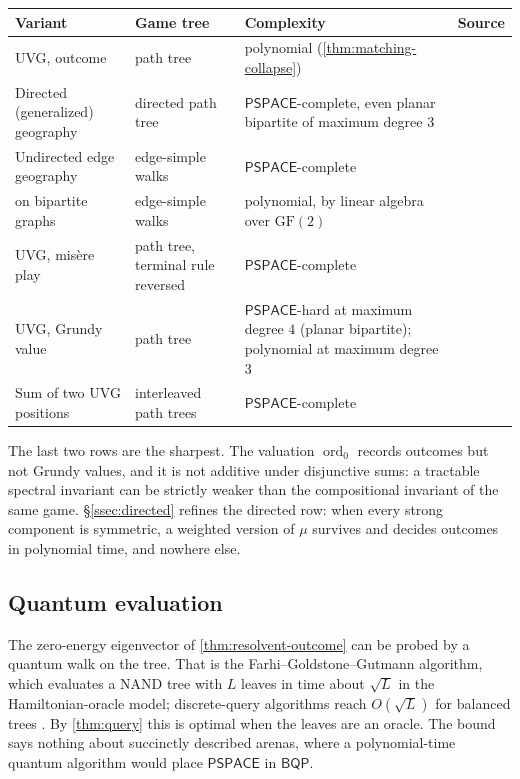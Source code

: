 \documentclass[final]{siamart0516}
\numberwithin{theorem}{section}
\numberwithin{equation}{section}
\theoremstyle{siamnonum}
\theoremstyle{plain}
\newcommand{\ord}{\operatorname{ord}}
\newcommand{\cls}[1]{\mathsf{#1}}
\newcommand{\PSPACE}{\cls{PSPACE}}
\newcommand{\BQP}{\cls{BQP}}
\begin{document}
\begin{center}
\begin{tabularx}{\linewidth}{@{}L{0.24}L{0.2}>{\raggedright\arraybackslash}X L{0.19}@{}}
\toprule
Variant & Game tree & Complexity & Source\\ \midrule
UVG, outcome & path tree & polynomial (\cref{thm:matching-collapse}) & \cite{FSU}\\
Directed (generalized) geography & directed path tree & $\PSPACE$-complete, even planar bipartite of maximum degree $3$ & \cite{LichtensteinSipser}\\
Undirected edge geography & edge-simple walks & $\PSPACE$-complete & \cite{FSU}\\
\quad on bipartite graphs & edge-simple walks & polynomial, by linear algebra over $\mathrm{GF}(2)$ & \cite{FSU}\\
UVG, mis\`ere play & path tree, terminal rule reversed & $\PSPACE$-complete & \cite{RenaultSchmidt}\\
UVG, Grundy value & path tree & $\PSPACE$-hard at maximum degree $4$ (planar bipartite); polynomial at maximum degree $3$ & \cite{BFT}\\
Sum of two UVG positions & interleaved path trees & $\PSPACE$-complete & \cite{BFT}\\
\bottomrule
\end{tabularx}
\end{center}

The last two rows are the sharpest. The valuation $\ord_0$ records outcomes but not Grundy values, and it is not additive under disjunctive sums: a tractable spectral invariant can be strictly weaker than the compositional invariant of the same game. \S\ref{ssec:directed} refines the directed row: when every strong component is symmetric, a weighted version of $\mu$ survives and decides outcomes in polynomial time, and nowhere else.

\subsection{Quantum evaluation}
The zero-energy eigenvector of \cref{thm:resolvent-outcome} can be probed by a quantum walk on the tree. That is the Farhi--Goldstone--Gutmann algorithm, which evaluates a NAND tree with $L$ leaves in time about $\sqrt L$ in the Hamiltonian-oracle model; discrete-query algorithms reach $O(\sqrt L)$ for balanced trees \cite{ACRSZ}. By \cref{thm:query} this is optimal when the leaves are an oracle. The bound says nothing about succinctly described arenas, where a polynomial-time quantum algorithm would place $\PSPACE$ in $\BQP$.
\end{document}
